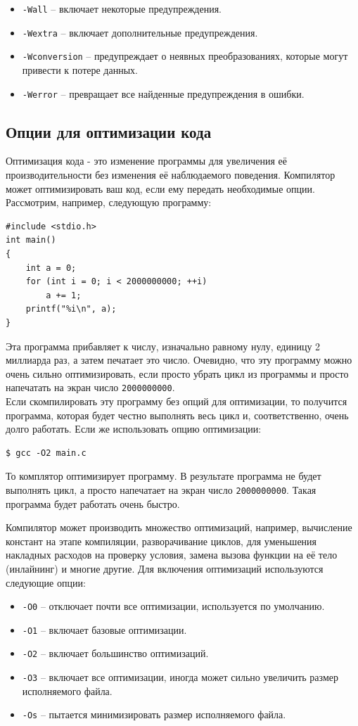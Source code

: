\documentclass{article}
\begin{document}
\begin{itemize}
\item \texttt{-Wall} -- включает некоторые предупреждения.
\item \texttt{-Wextra} -- включает дополнительные предупреждения.
\item \texttt{-Wconversion} -- предупреждает о неявных преобразованиях, которые могут привести к потере данных.
\item \texttt{-Werror} -- превращает все найденные предупреждения в ошибки.
\end{itemize}





\subsection*{Опции для оптимизации кода}
Оптимизация кода - это изменение программы для увеличения её производительности без изменения её наблюдаемого поведения. Компилятор может оптимизировать ваш код, если ему передать необходимые опции. Рассмотрим, например, следующую программу:
\begin{lstlisting}[style=csMiptCppStyle]
#include <stdio.h>
int main()
{
    int a = 0;
    for (int i = 0; i < 2000000000; ++i)
        a += 1;
    printf("%i\n", a);
}
\end{lstlisting}
Эта программа прибавляет к числу, изначально равному нулу, единицу 2 миллиарда раз, а затем печатает это число. Очевидно, что эту программу можно очень сильно оптимизировать, если просто убрать цикл из программы и просто напечатать на экран число \texttt{2000000000}.\\
Если скомпилировать эту программу без опций для оптимизации, то получится программа, которая будет честно выполнять весь цикл и, соответственно, очень долго работать. Если же использовать опцию оптимизации:
\begin{lstlisting}[style=csMiptBash]
$ gcc -O2 main.c
\end{lstlisting}
То комплятор оптимизирует программу. В результате программа не будет выполнять цикл, а просто напечатает на экран число \texttt{2000000000}. Такая программа будет работать очень быстро. 

Компилятор может производить множество оптимизаций, например, вычисление констант на этапе компиляции, разворачивание циклов, для уменьшения накладных расходов на проверку условия, замена вызова функции на её тело (инлайнинг) и многие другие. Для включения оптимизаций используются следующие опции:
\begin{itemize}
\item \texttt{-O0} -- отключает почти все оптимизации, используется по умолчанию.
\item \texttt{-O1} -- включает базовые оптимизации.
\item \texttt{-O2} -- включает большинство оптимизаций.
\item \texttt{-O3} -- включает все оптимизации, иногда может сильно увеличить размер исполняемого файла.
\item \texttt{-Os} -- пытается минимизировать размер исполняемого файла.
\end{itemize}
\end{document}

